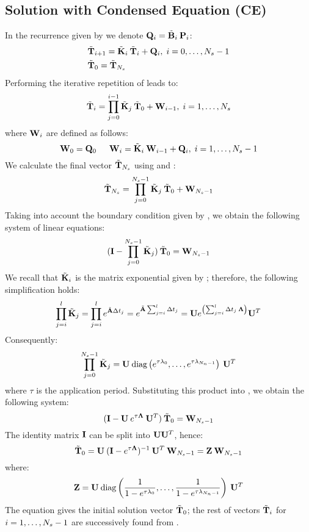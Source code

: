 \subsection{Solution with Condensed Equation (CE)} 

In the recurrence given by  we denote $\mathbf{Q}_i =
\tilde{\mathbf{B}}_i \: \mathbf{P}_i$:
\begin{align}
  & \tv{T}_{i + 1} = \tm{K}_i \: \tv{T}_i + \m{Q}_i, \; i = \range{0}{N_s - 1} \elab{ce-recurrent} \\
  & \tv{T}_0 = \tv{T}_{N_s} \nonumber
\end{align}
Performing the iterative repetition of  leads to:
\begin{equation} \elab{y-recurrent}
  \tv{T}_i = \prod_{j = 0}^{i - 1} \tm{K}_j \: \tv{T}_0 + \m{W}_{i - 1}, \; i = \range{1}{N_s}
\end{equation}
where $\mathbf{W}_i$ are defined as follows:
\begin{equation}
  \m{W}_0 = \m{Q}_0 \hspace{15pt} \m{W}_i = \tm{K}_i \: \m{W}_{i - 1} + \m{Q}_i, \; i = \range{1}{N_s - 1} \elab{p-recurrent}
\end{equation}
We calculate the final vector $\tilde{\mathbf{T}}_{N_s}$ using  and
:
\[
  \tilde{\mathbf{T}}_{N_s} = \prod_{j = 0}^{N_s - 1} \tilde{\mathbf{K}}_j \: \tilde{\mathbf{T}}_0 + \mathbf{W}_{N_s - 1}
\]
Taking into account the boundary condition given by ,
we obtain the following system of linear equations:
\begin{equation} \elab{core-system}
  (\m{I} - \prod_{j = 0}^{N_s - 1} \tm{K}_j) \: \tv{T}_0 = \m{W}_{N_s - 1}
\end{equation}
We recall that $\tilde{\mathbf{K}}_i$ is the matrix exponential given by
; therefore, the following simplification holds:
\[
  \prod_{j = i}^l \tilde{\mathbf{K}}_j = \prod_{j = i}^l e^{\tilde{\mathbf{A}} \Delta t_j} = e^{\tilde{\mathbf{A}} \sum_{j = i}^l \Delta t_j} = \mathbf{U} e^{\left( \sum_{j = i}^l \Delta t_j \: \mathbf{\Lambda} \right)} \mathbf{U}^T
\]
Consequently:
\[
  \prod_{j = 0}^{N_s - 1} \tilde{\mathbf{K}}_j = \mathbf{U} \: \text{diag} \left( e^{\tau \lambda_0}, \dots, e^{\tau \lambda_{N_n - 1}} \right) \: \mathbf{U}^T
\]
where $\tau$ is the application period. Substituting this product into
, we obtain the following system:
\[
  (\mathbf{I} - \mathbf{U} \: e^{\tau \mathbf{\Lambda}} \: \mathbf{U}^T) \: \tilde{\mathbf{T}}_0 = \mathbf{W}_{N_s - 1}
\]
The identity matrix $\mathbf{I}$ can be split into $\mathbf{U} \mathbf{U}^T$, hence:
\begin{equation} \elab{t0}
  \tv{T}_0 = \m{U} \: (\m{I} - e^{\tau \m{\Lambda}})^{-1} \: \m{U}^T \: \m{W}_{N_s - 1} = \m{Z} \: \m{W}_{N_s - 1}
\end{equation}
where:
\[
  \mathbf{Z} = \mathbf{U} \: \text{diag} \left( \frac{1}{1 - e^{\tau \lambda_0}}, \dots, \frac{1}{1 - e^{\tau \lambda_{N_n - 1}}} \right) \: \mathbf{U}^T
\]
The equation gives the initial solution vector $\tilde{\mathbf{T}}_0$; the rest of vectors
$\tilde{\mathbf{T}}_i$ for $i = 1, \dots, N_s - 1$ are successively found from
.

